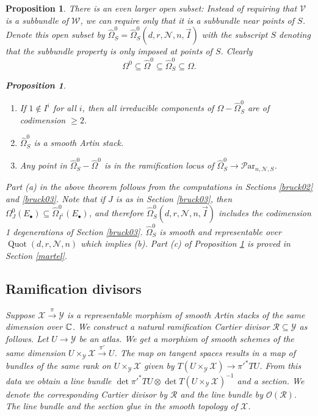 \documentclass[11pt]{amsart}
\newcommand\op{\operatorname}
\newcommand\bull{{\bullet}}
\newcommand\mv{\mathcal{V}}
\newcommand\tensor{\otimes}
\newcommand\mw{\mathcal{W}}
\newcommand\mn{\mathcal{N}}
\newcommand\Par{\mathcal{P}\text{ar} }
\newcommand{\leto}[1]{\stackrel{#1}{\to}}
\newtheorem{proposition}[theorem]{Proposition}
\numberwithin{theorem}{subsection}
\begin{document}
{\begin{proposition}
There is an even larger  open subset: Instead of requiring that $\mv$ is a subbundle of $\mw$, we can require only that it is a subbundle near points of $S$. Denote this open subset by $\widehat{\Omega}_{S}^0=\widehat{\Omega}_{S}^0(d,r,\mn,n,\vec{I})$ with the subscript $S$ denoting that the subbundle property is only imposed at points of $S$. Clearly $$\Omega^0\subseteq \widehat{\Omega}^0\subseteq \widehat{\Omega}_{S}^0\subseteq \Omega.$$
\begin{proposition}\label{bee}
\hspace{2em}
\begin{enumerate}
\item[(a)] If $1\not\in I^i$ for all $i$, then   all irreducible components of $\Omega-\widehat{\Omega}_{S}^0$ are of codimension $\geq 2$.
\item[(b)] $\widehat{\Omega}_{S}^0$ is a smooth Artin stack.
\item[(c)] Any point in $\widehat{\Omega}_{S}^0-\widehat{\Omega}^0$ is in the ramification locus of $\widehat{\Omega}_{S}^0\to \Par_{n,\mn,S}$.
\end{enumerate}
\end{proposition}
Part (a) in the above theorem follows from the computations in Sections \ref{bruck02} and \ref{bruck03}.
Note that if $J$ is as in Section \ref{bruck03}, then ${\Omega}^0_J(E_{\bull}) \subseteq \widehat{\Omega}^0_{I^1}(E_{\bull})$, and therefore $\widehat{\Omega}_{S}^0(d,r,\mn,n,\vec{I})$ includes the codimension 1 degenerations of Section \ref{bruck03}.
 $\widehat{\Omega}_{S}^0$ is smooth and representable over $\op{Quot}(d,r,\mn,n)$ which implies (b).
 Part (c) of Proposition \ref{bee} is proved in  Section \ref{martel}.
\subsection{Ramification divisors}\label{RamDiv}
Suppose $\mathcal{X}\leto{\pi} \mathcal{Y}$ is a representable morphism of smooth Artin stacks of the same dimension over $\Bbb{C}$. We construct a natural  ramification Cartier divisor $\mathcal{R}\subseteq \mathcal{Y}$ as follows. Let $U\to \mathcal{Y}$
be an atlas. We get a morphism of smooth schemes of the same dimension
$U\times_{\mathcal{Y}}\mathcal{X}\leto{\pi'} U$. The map on tangent spaces results in  a map of bundles of the same rank on $U\times_{\mathcal{Y}}\mathcal{X}$ given by $T (U\times_{\mathcal{Y}} \mathcal{X}) \to \pi'^* TU$. From this data we obtain  a line bundle $\det \pi'^* TU\tensor \det T (U\times_{\mathcal{Y}}\mathcal{X})^{-1}$ and a section. We denote the corresponding Cartier divisor by $\mathcal{R}$ and the line bundle by $\mathcal{O}(\mathcal{R})$. The line bundle and the section glue in the smooth topology of $\mathcal{X}$.



\end{proposition}}
\end{document}
